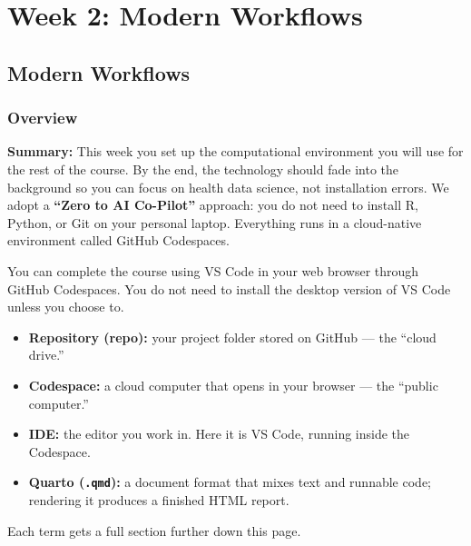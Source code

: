 \documentclass[
  letterpaper,
  DIV=11,
  numbers=noendperiod,
  oneside]{scrreprt}
\providecommand{\tightlist}{%
  \setlength{\itemsep}{0pt}\setlength{\parskip}{0pt}}
\begin{document}
\part{Week 2: Modern Workflows}

\chapter*{Modern Workflows}\label{modern-workflows}


\section*{Overview}\label{overview-1}


\textbf{Summary:} This week you set up the computational environment you
will use for the rest of the course. By the end, the technology should
fade into the background so you can focus on health data science, not
installation errors. We adopt a \textbf{``Zero to AI Co-Pilot''}
approach: you do not need to install R, Python, or Git on your personal
laptop. Everything runs in a cloud-native environment called GitHub
Codespaces.

You can complete the course using VS Code in your web browser through
GitHub Codespaces. You do not need to install the desktop version of VS
Code unless you choose to.

\begin{tcolorbox}[enhanced jigsaw, title=\textcolor{quarto-callout-note-color}{\faInfo}\hspace{0.5em}{Key Terms This Week}, arc=.35mm, toptitle=1mm, colframe=quarto-callout-note-color-frame, toprule=.15mm, leftrule=.75mm, bottomtitle=1mm, opacityback=0, bottomrule=.15mm, coltitle=black, breakable, opacitybacktitle=0.6, titlerule=0mm, colback=white, left=2mm, colbacktitle=quarto-callout-note-color!10!white, rightrule=.15mm]

\begin{itemize}
\tightlist
\item
  \textbf{Repository (repo):} your project folder stored on GitHub ---
  the ``cloud drive.''
\item
  \textbf{Codespace:} a cloud computer that opens in your browser ---
  the ``public computer.''
\item
  \textbf{IDE:} the editor you work in. Here it is VS Code, running
  inside the Codespace.
\item
  \textbf{Quarto (\texttt{.qmd}):} a document format that mixes text and
  runnable code; rendering it produces a finished HTML report.
\end{itemize}

Each term gets a full section further down this page.

\end{tcolorbox}
\end{document}
